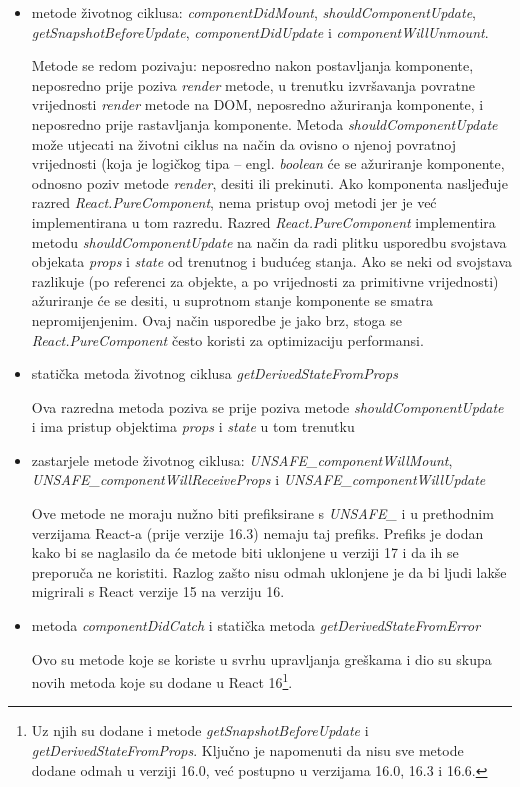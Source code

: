 \documentclass[times, utf8, diplomski, numeric]{fer}
\newcommand{\razmaks}{\vspace{10pt}}
\begin{document}
\begin{itemize}
    \item metode životnog ciklusa: \emph{componentDidMount}, \emph{shouldComponentUpdate},
    \break \emph{getSnapshotBeforeUpdate}, \emph{componentDidUpdate} i \emph{componentWillUnmount}.
    
    Metode se redom pozivaju: neposredno nakon postavljanja komponente, neposredno prije poziva \emph{render} metode, u trenutku izvršavanja  povratne vrijednosti \emph{render} metode na DOM, neposredno ažuriranja komponente, i neposredno prije rastavljanja komponente.
    Metoda \emph{shouldComponentUpdate} može utjecati na životni ciklus na način da ovisno o njenoj povratnoj vrijednosti (koja je logičkog tipa – engl. \emph{boolean} će se ažuriranje komponente, odnosno poziv metode \emph{render}, desiti ili prekinuti.
    Ako komponenta nasljeđuje razred \emph{React.PureComponent}, nema pristup ovoj metodi jer je već implementirana u tom razredu.
    Razred \emph{React.PureComponent} implementira metodu \emph{shouldComponentUpdate} na način da radi plitku usporedbu  svojstava objekata \emph{props} i \emph{state} od trenutnog i budućeg stanja. Ako se neki od svojstava razlikuje (po referenci za objekte, a po vrijednosti za primitivne vrijednosti) ažuriranje će se desiti, u suprotnom stanje komponente se smatra nepromijenjenim. Ovaj način usporedbe je jako brz, stoga se \emph{React.PureComponent} često koristi za optimizaciju performansi\citep{react_docs}.

    \item statička metoda životnog ciklusa \emph{getDerivedStateFromProps}
    
    Ova razredna metoda poziva se prije poziva metode \emph{shouldComponentUpdate} i ima pristup objektima \emph{props} i \emph{state} u tom trenutku

    \item zastarjele metode životnog ciklusa: \emph{UNSAFE\_componentWillMount},
    \break \emph{UNSAFE\_componentWillReceiveProps} i \emph{UNSAFE\_componentWillUpdate}
    
    Ove metode ne moraju nužno biti prefiksirane s \emph{UNSAFE\_} i u prethodnim verzijama React-a (prije verzije 16.3) nemaju taj prefiks.
    Prefiks je dodan kako bi se naglasilo da će metode biti uklonjene u verziji 17 i da ih se preporuča ne koristiti.
    Razlog zašto nisu odmah uklonjene je da bi ljudi lakše migrirali s React verzije 15 na verziju 16\citep{react_16_3}.

    \item metoda \emph{componentDidCatch} i statička metoda \emph{getDerivedStateFromError}
    
    Ovo su metode koje se koriste u svrhu upravljanja greškama  i dio su skupa novih metoda koje su dodane u React 16\footnote{
        Uz njih su dodane i metode \emph{getSnapshotBeforeUpdate} i \emph{getDerivedStateFromProps}. Ključno je napomenuti da nisu sve metode dodane odmah u verziji 16.0, već postupno u verzijama 16.0, 16.3 i 16.6\citep{gh_react_changelog}.
    }\citep{react_error}.
\end{itemize}
\razmaks
\end{document}
